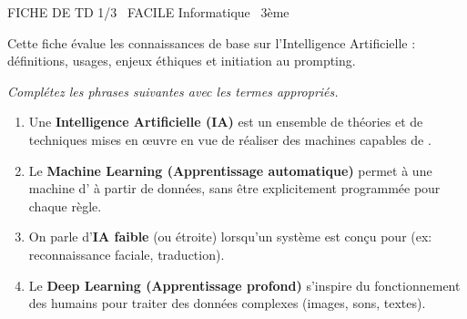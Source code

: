 \documentclass[11pt]{article}
\begin{document}
\begin{tcolorbox}[enhanced,colback=popink,colframe=popink,arc=10pt,boxrule=0pt,left=12pt,right=12pt,top=9pt,bottom=9pt]
{\color{white}\popxbold\small FICHE DE TD 1/3 \textbullet\ FACILE \hfill Informatique \textbullet\ 3ème\par}
\end{tcolorbox}
\vspace{4pt}
Cette fiche évalue les connaissances de base sur l'Intelligence Artificielle : définitions, usages, enjeux éthiques et initiation au prompting.

\begin{exercice}
\emph{Complétez les phrases suivantes avec les termes appropriés.}
\begin{enumerate}
    \item Une \textbf{Intelligence Artificielle (IA)} est un ensemble de théories et de techniques mises en œuvre en vue de réaliser des machines capables de \underline{\hspace{4cm}}.
    \item Le \textbf{Machine Learning (Apprentissage automatique)} permet à une machine d'\underline{\hspace{4cm}} à partir de données, sans être explicitement programmée pour chaque règle.
    \item On parle d'\textbf{IA faible} (ou étroite) lorsqu'un système est conçu pour \underline{\hspace{4cm}} (ex: reconnaissance faciale, traduction).
    \item Le \textbf{Deep Learning (Apprentissage profond)} s'inspire du fonctionnement des \underline{\hspace{4cm}} humains pour traiter des données complexes (images, sons, textes).
\end{enumerate}
\end{exercice}
\end{document}
